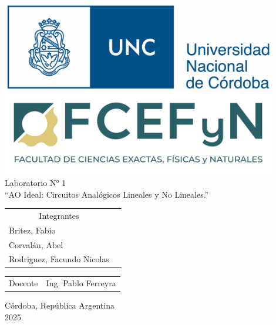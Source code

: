 \begin{titlepage}
    

\thispagestyle{empty}


\begin{center}
    \includegraphics[width=12cm]{img/unc_logo.png} 
    \includegraphics[width=12cm]{img/fcefyn_logo.jpg}
    \\[1cm]
    \vspace{5pt}
     \large Laboratorio N° 1
    \\[0.8cm]
    \large “AO Ideal: Circuitos Analógicos Lineales y No Lineales.”
    \\[0.2cm]
    \vspace{60pt}
    \begin{table}[!h]
    
    \centering
    \begin{tabular}{ll}
    \multicolumn{1}{c}{Integrantes} \\
    Britez, Fabio\\
    Corvalán, Abel \\
    Rodriguez, Facundo Nicolas 
    \end{tabular}
    \end{table}
    \vspace{20pt}
    \begin{table}[!h]
    \centering
    
    \begin{tabular}{ll}
    \multicolumn{1}{c}{Docente} & Ing. Pablo Ferreyra
    \end{tabular}
    \end{table}
    \vfill
    Córdoba, República Argentina\\
    2025\\
\end{center}

\end{titlepage}